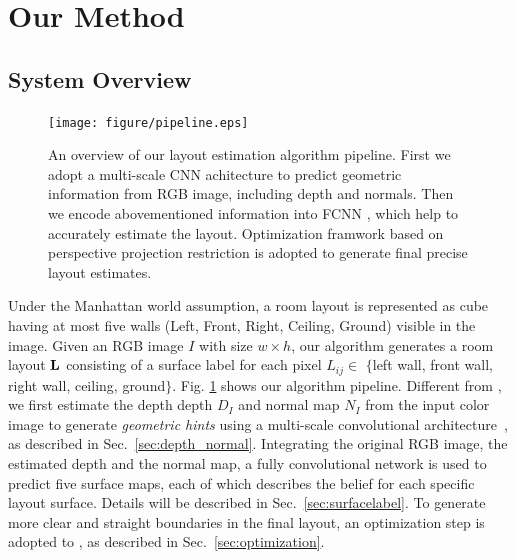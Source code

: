 \section{Our Method}
\label{sec:Meth}


\subsection{System Overview}
\label{subsection:overview}

\begin{figure}[!ht]
	\centering
	\texttt{[image: figure/pipeline.eps]}
	\caption{An overview of our layout estimation algorithm pipeline. First we adopt a multi-scale CNN achitecture to predict geometric information from RGB image, including depth and normals. Then we encode abovementioned information into FCNN , which help to accurately estimate the layout. Optimization framwork based on perspective projection restriction is adopted to generate final precise layout estimates.}
	\label{fig:pipeline}
\end{figure}

Under the Manhattan world assumption, a room layout is represented as cube having at most five walls (Left, Front, Right, Ceiling, Ground) visible in the image. 
%
Given an RGB image $I$ with  size $w\times h$, our algorithm generates a room layout $\mathbf{L}$ consisting of a surface label for each pixel $L_{ij}\in $ $\{$left wall, front wall, right wall, ceiling, ground$\}$. 
Fig. \ref{fig:pipeline} shows our algorithm pipeline. 
Different from \cite{dasgupta2016delay}, we first estimate the depth depth $D_{I}$ and normal map $N_{I}$ from the input color image to generate \emph{geometric hints} using a multi-scale convolutional architecture~\cite{eigen2015predicting}, as described in Sec.~\ref{sec:depth_normal}.
Integrating the original RGB image, the estimated depth and the normal map, a fully convolutional network is used to predict five surface maps, each of which describes the belief for each specific layout surface. Details will be described in Sec.~\ref{sec:surfacelabel}.
To generate more clear and straight boundaries in the final layout, an optimization step is adopted to , as described in Sec.~\ref{sec:optimization}.



